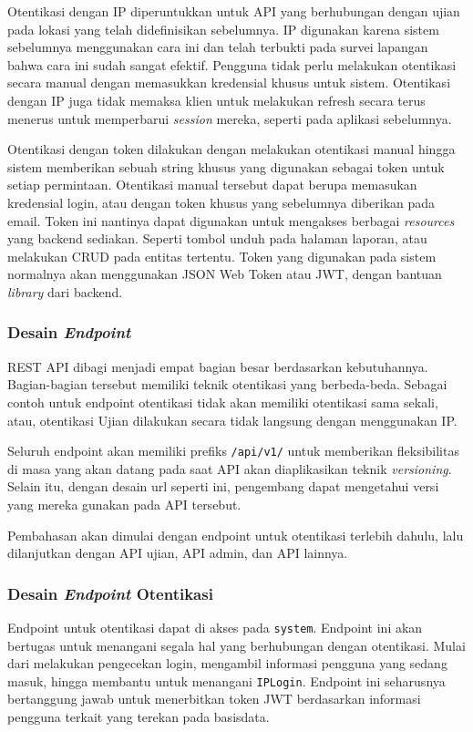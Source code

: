     Otentikasi dengan IP diperuntukkan untuk API yang berhubungan dengan ujian
    pada lokasi yang telah didefinisikan sebelumnya. IP digunakan karena sistem
    sebelumnya menggunakan cara ini dan telah terbukti pada survei lapangan
    bahwa cara ini sudah sangat efektif. Pengguna tidak perlu melakukan
    otentikasi secara manual dengan memasukkan kredensial khusus untuk sistem.
    Otentikasi dengan IP juga tidak memaksa klien untuk melakukan refresh secara
    terus menerus untuk memperbarui \textit{session} mereka, seperti pada
    aplikasi sebelumnya.
    
    Otentikasi dengan token dilakukan dengan melakukan otentikasi manual hingga
    sistem memberikan sebuah string khusus yang digunakan sebagai token untuk
    setiap permintaan. Otentikasi manual tersebut dapat berupa memasukan
    kredensial login, atau dengan token khusus yang sebelumnya diberikan pada
    email. Token ini nantinya dapat digunakan untuk mengakses berbagai
    \textit{resources} yang backend sediakan. Seperti tombol unduh pada halaman
    laporan, atau melakukan CRUD pada entitas tertentu. Token yang digunakan
    pada sistem normalnya akan menggunakan JSON Web Token atau JWT, dengan
    bantuan \textit{library} dari backend.
    
\subsubsection{Desain \textit{Endpoint}} REST API dibagi menjadi empat bagian
    besar berdasarkan kebutuhannya. Bagian-bagian tersebut memiliki teknik
    otentikasi yang berbeda-beda. Sebagai contoh untuk endpoint otentikasi tidak
    akan memiliki otentikasi sama sekali, atau, otentikasi Ujian dilakukan
    secara tidak langsung dengan menggunakan IP. 
    
    Seluruh endpoint akan memiliki prefiks \texttt{/api/v1/} untuk memberikan
    fleksibilitas di masa yang akan datang pada saat API akan diaplikasikan
    teknik \textit{versioning}. Selain itu, dengan desain url seperti ini,
    pengembang dapat mengetahui versi yang mereka gunakan pada API tersebut.
    
    Pembahasan akan dimulai dengan endpoint untuk otentikasi terlebih dahulu,
    lalu dilanjutkan dengan API ujian, API admin, dan API lainnya.
    
\subsubsection{Desain \textit{Endpoint} Otentikasi} Endpoint untuk otentikasi
    dapat di akses pada \texttt{system}. Endpoint ini akan bertugas untuk
    menangani segala hal yang berhubungan dengan otentikasi. Mulai dari
    melakukan pengecekan login, mengambil informasi pengguna yang sedang masuk,
    hingga membantu untuk menangani \texttt{IPLogin}. Endpoint ini seharusnya
    bertanggung jawab untuk menerbitkan token JWT berdasarkan informasi pengguna
    terkait yang terekan pada basisdata.
    
